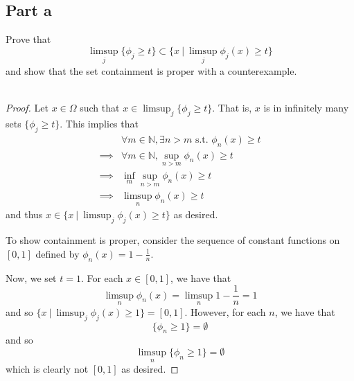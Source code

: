 \documentclass[fontsize=11pt]{scrartcl} %
\numberwithin{equation}{section} %
\numberwithin{figure}{section} %
\numberwithin{table}{section} %
\newcommand{\N}{\mathbb{N}}
\begin{document}
\subsection*{Part a}
Prove that
\[
    \limsup_j \{\phi_j\geq t\} \subset \{x\ |\ \limsup_j \phi_j(x) \geq t\}
\]
and show that the set containment is proper with a counterexample.
\\
\\
\begin{proof}
    Let $x\in\Omega$ such that $x\in\limsup_j \{\phi_j\geq t\}$. That is, $x$ is
    in infinitely many sets $\{\phi_j \geq t\}$. This implies that
    \[
        \begin{aligned}
            &\forall m\in \N, \exists n>m \textrm{ s.t. } \phi_n(x)\geq t\\
            \implies &\forall m\in \N, \sup_{n>m}\phi_n(x)\geq t\\
            \implies &\inf_m\sup_{n>m}\phi_n(x) \geq t\\
            \implies &\limsup_n\phi_n(x) \geq t
        \end{aligned}
    \]
    and thus $x\in\{x\ |\ \limsup_j \phi_j(x) \geq t\}$ as desired.

    To show containment is proper, consider the sequence of constant functions
    on $[0,1]$ defined by $\phi_n(x) = 1-\frac{1}{n}$.

    Now, we set $t=1$. For each $x\in[0,1]$, we have that
    \[
        \limsup_n\phi_n(x) = \limsup_n 1-\frac{1}{n} = 1
    \]
    and so $\{x\ |\ \limsup_j \phi_j(x) \geq 1\} = [0,1]$. However, for each
    $n$, we have that
    \[
        \{\phi_n\geq 1\} = \emptyset
    \]
    and so
    \[
        \limsup_n \{\phi_n\geq 1\} = \emptyset
    \]
    which is clearly not $[0,1]$ as desired.
\end{proof}
\end{document}
